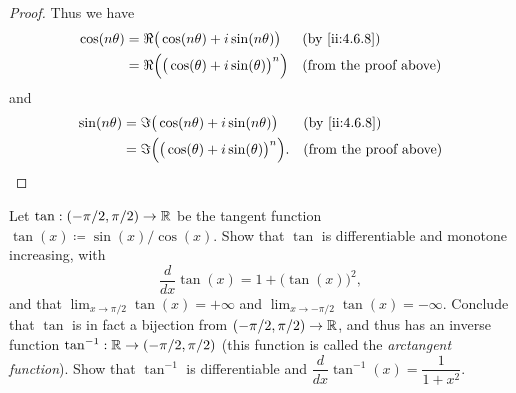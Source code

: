 \begin{proof}
  Thus we have
  \begin{align*}
    \cos(n \theta) & = \Re\big(\cos(n \theta) + i \sin(n \theta)\big)         &  & \by{ii:4.6.8}                 \\
                   & = \Re\Big(\big(\cos(\theta) + i \sin(\theta)\big)^n\Big) &  & \text{(from the proof above)}
  \end{align*}
  and
  \begin{align*}
    \sin(n \theta) & = \Im\big(\cos(n \theta) + i \sin(n \theta)\big)          &  & \by{ii:4.6.8}                 \\
                   & = \Im\Big(\big(\cos(\theta) + i \sin(\theta)\big)^n\Big). &  & \text{(from the proof above)}
  \end{align*}
\end{proof}

\begin{ex}\label{ii:ex:4.7.8}
  Let \(\tan : (- \pi / 2, \pi / 2) \to \mathbb{R}\) be the tangent function \(\tan(x) \coloneqq \sin(x) / \cos(x)\).
  Show that \(\tan\) is differentiable and monotone increasing, with
  \[
    \dfrac{d}{dx} \tan(x) = 1 + \big(\tan(x)\big)^2,
  \]
  and that \(\lim_{x \to \pi / 2} \tan(x) = +\infty\) and \(\lim_{x \to -\pi / 2} \tan(x) = -\infty\).
  Conclude that \(\tan\) is in fact a bijection from \((- \pi / 2, \pi / 2) \to \mathbb{R}\), and thus has an inverse function \(\tan^{-1} : \mathbb{R} \to (- \pi / 2, \pi / 2)\)
  (this function is called the \emph{arctangent function}).
  Show that \(\tan^{-1}\) is differentiable and \(\dfrac{d}{dx} \tan^{-1}(x) = \dfrac{1}{1 + x^2}\).
\end{ex}

